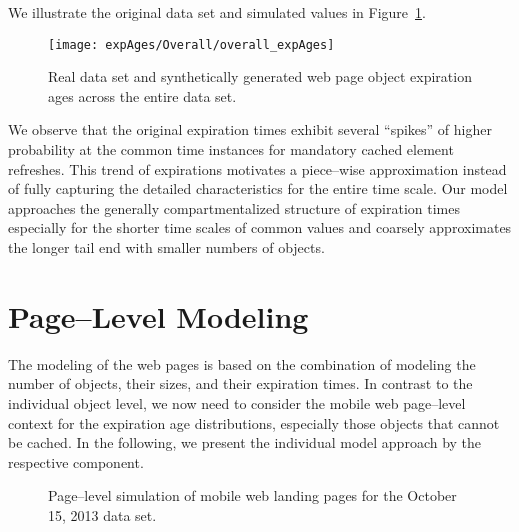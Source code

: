 \documentclass[letterpaper,conference]{IEEEtran}
\begin{document}
We illustrate the original data set and simulated values in Figure~\ref{fig:oexp}.
\begin{figure}[b]
	\centering
	\texttt{[image: expAges/Overall/overall\_expAges]}
	\caption{Real data set and synthetically generated web page object expiration ages across the entire data set.}
	\label{fig:oexp}
\end{figure}
We observe that the original expiration times exhibit several ``spikes'' of higher probability at the common time instances for mandatory cached element refreshes. 
This trend of expirations motivates a piece--wise approximation instead of fully capturing the detailed characteristics for the entire time scale.
Our model approaches the generally compartmentalized structure of expiration times especially for the shorter time scales of common values and coarsely approximates the longer tail end with smaller numbers of objects.


\section{Page--Level Modeling}
\label{s:page}
The modeling of the web pages is based on the combination of modeling the number of objects, their sizes, and their expiration times.
In contrast to the individual object level, we now need to consider the mobile web page--level context for the expiration age distributions, especially those objects that cannot be cached.
In the following, we present the individual model approach by the respective component.

\begin{figure}[t!]
	\centering
	\qquad
	\vspace{.1in}
	\qquad
	\vspace{.1in}
	\qquad	
	\vspace{.1in}
	\caption{Page--level simulation of mobile web landing pages for the October 15, 2013 data set.\label{fig:pages}}
\end{figure}
\end{document}
